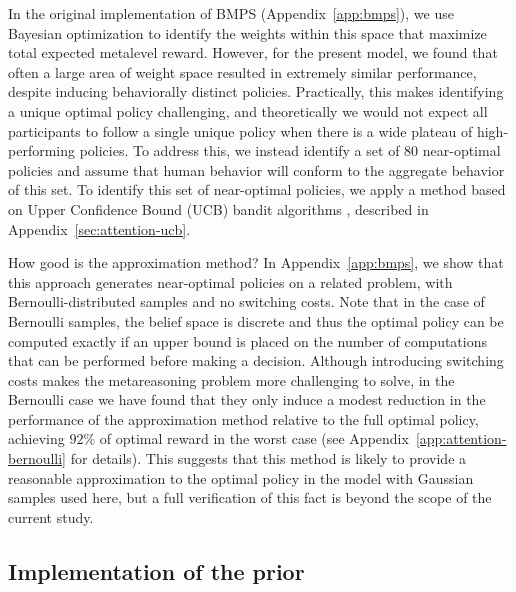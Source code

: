 In the original implementation of BMPS (Appendix~\ref{app:bmps}), we use Bayesian optimization to identify the weights within this space that maximize total expected metalevel reward. However, for the present model, we found that often a large area of weight space resulted in extremely similar performance, despite inducing behaviorally distinct policies. Practically, this makes identifying a unique optimal policy challenging, and theoretically we would not expect all participants to follow a single unique policy when there is a wide plateau of high-performing policies. To address this, we instead identify a set of 80 near-optimal policies and assume that human behavior will conform to the aggregate behavior of this set. To identify this set of near-optimal policies, we apply a method based on Upper Confidence Bound (UCB) bandit algorithms \citep{auer2002finite}, described in Appendix~\ref{sec:attention-ucb}.

How good is the approximation method? In Appendix~\ref{app:bmps}, we show that this approach generates near-optimal policies on a related problem, with Bernoulli-distributed samples and no switching costs. Note that in the case of Bernoulli samples, the belief space is discrete and thus the optimal policy can be computed exactly if an upper bound is placed on the number of computations that can be performed before making a decision. Although introducing switching costs makes the metareasoning problem more challenging to solve, in the Bernoulli case we have found that they only induce a modest reduction in the performance of the approximation method relative to the full optimal policy, achieving $92\%$ of optimal reward in the worst case (see Appendix~\ref{app:attention-bernoulli} for details). This suggests that this method is likely to provide a reasonable approximation to the optimal policy in the model with Gaussian samples used here, but a full verification of this fact is beyond the scope of the current study.


\subsection{Implementation of the prior}


